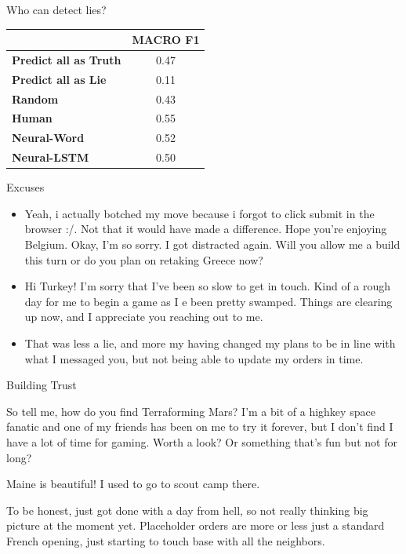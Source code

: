 \documentclass[xcolor=dvipsnames]{beamer}
\begin{document}
\begin{frame}{Who can detect lies?}
\begin{center}
	\begin{tabular}{ l c }
		\toprule
		\textbf{}            & \textbf{MACRO F1}  \\ 
		\hline			
		\textbf{Predict all as Truth}       &0.47 \\ 
\pause
                \textbf{Predict all as  Lie}       & 0.11  \\
		\textbf{Random}      & 0.43	\\ 
\pause
                \textbf{Human}       & 0.55	\\ 
\pause
                \textbf{Neural-Word} &	0.52 \\ 
		\textbf{Neural-LSTM} &	0.50 \\ 
		\bottomrule
	\end{tabular}
\end{center}
\end{frame}

\begin{frame}{Excuses}

  \begin{itemize}
    \item Yeah, i actually botched my move because i forgot to click submit in the browser :/. Not that it would have made a difference. Hope you’re enjoying Belgium.
Okay, I’m so sorry. I got distracted again. Will you allow me a build this turn or do you plan on retaking Greece now?
    \item Hi Turkey! I’m sorry that I’ve been so slow to get in touch. Kind of a rough day for me to begin a game as I e been pretty swamped. Things are clearing up now, and I appreciate you reaching out to me.
              \item That was less a lie, and more my having changed my plans to be in line with what I messaged you, but not being able to update my orders in time.
  \end{itemize}
  
\end{frame}

\begin{frame}{Building Trust}

  \begin{itemize*}
    \item So tell me, how do you find Terraforming Mars? I'm a bit of a highkey space fanatic and one of my friends has been on me to try it forever, but I don't find I have a lot of time for gaming. Worth a look? Or something that's fun but not for long?
        \item \alert<2>{Maine is beautiful! I used to go to scout camp there.}
    \item To be honest, just got done with a day from hell, so not really thinking big picture at the moment yet. Placeholder orders are more or less just a standard French opening, just starting to touch base with all the neighbors.
  \end{itemize*}

\end{frame}
\end{document}
